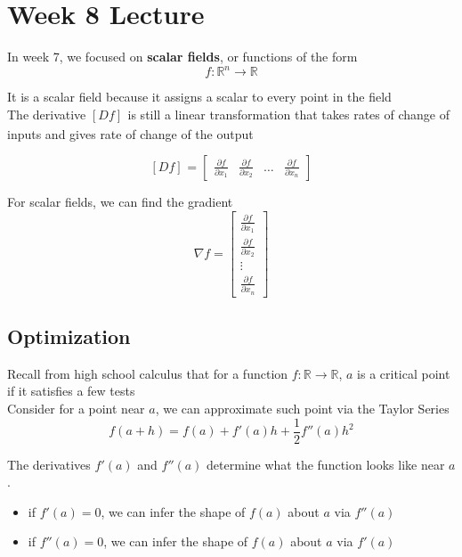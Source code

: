 \chapter{Week 8 Lecture}


In week 7, we focused on \textbf{scalar fields}, or functions of the form 
\[
  f: \mathbb{R}^n \rightarrow \mathbb{R}
\] 

It is a scalar field because it assigns a scalar to every point in the field \\
 
The derivative $\left[ D f \right]_{} $ is still a linear transformation that takes rates of change of inputs and gives rate of change of the output

\[
  \left[ D f \right]_{}  = \begin{bmatrix} 
     \frac{\partial f}{\partial x_1}   & \frac{\partial f}{\partial x_2} & \hdots & \frac{\partial f}{\partial x_n}
  \end{bmatrix} 
\] 

For scalar fields, we can find the gradient \[
   \nabla f = \begin{bmatrix} 
     \frac{\partial f}{\partial x_1}   \\ \frac{\partial f}{\partial x_2} \\ \vdots \\ \frac{\partial f}{\partial x_n}
   \end{bmatrix}
\] 

\section{Optimization}

Recall from high school calculus that for a function $f: \mathbb{R} \rightarrow \mathbb{R}$, $a$ is a critical point if it satisfies a few tests \\

Consider for a point near $a$, we can approximate such point via the Taylor Series
\[
  f(a+h) = f(a) + f'(a)h + \frac{1}{2}f''(a)h^2
\] 

The derivatives $f'(a)$ and $f''(a)$ determine what the function looks like near $a$.
\begin{itemize}
   \item if $f'(a)=0$, we can infer the shape of $f(a)$ about $a$ via $f''(a)$
   \item if $f''(a)=0$, we can infer the shape of $f(a)$ about $a$ via $f'(a)$
\end{itemize}

